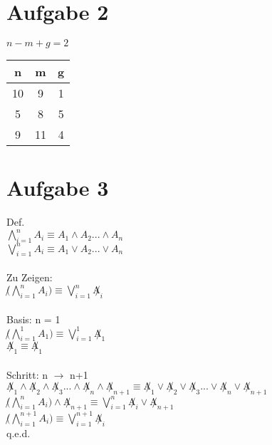 \documentclass{article}
\begin{document}
	\section*{Aufgabe 2}
	$n - m + g = 2$
	\begin{tabular}[h]{c|c|c}
		n & m & g \\
		\hline
		10&9&1 \\
		5&8&5 \\
		9&11&4 
		
	\end{tabular}
	\section*{Aufgabe 3}
	Def. \\
	$\bigwedge_{i = 1}^{n} A_i \equiv A_1 \land A_2 ... \land A_n $ \\
	$\bigvee_{i = 1}^{n} A_i \equiv A_1 \lor A_2 ... \lor A_n$ \\ \\
	Zu Zeigen: \\
	$\not(\bigwedge_{i = 1}^{n} A_i) \equiv \bigvee_{i = 1}^{n} \not A_i$ \\ \\
	Basis: n = 1 \\
	$\not(\bigwedge_{i = 1}^{1} A_1) \equiv \bigvee_{i = 1}^{1} \not A_1$ \\
	$\not A_1 \equiv \not A_1$ \\ \\
	Schritt: n $\to$ n+1 \\
	$\not A_1 \land \not A_2 \land \not A_3 ... \land \not A_n \land \not A_{n+1} \equiv \not A_1 \lor \not A_2 \lor \not A_3 ... \lor \not A_n \lor \not A_{n+1}$ \\
	$\not(\bigwedge_{i = 1}^{n} A_i) \land \not A_{n+1} \equiv \bigvee_{i = 1}^{n} \not A_i \lor  \not A_{n+1}$ \\
	$\not(\bigwedge_{i = 1}^{n+1} A_i) \equiv \bigvee_{i = 1}^{n+1} \not A_i$ \\
	q.e.d.
\end{document}
